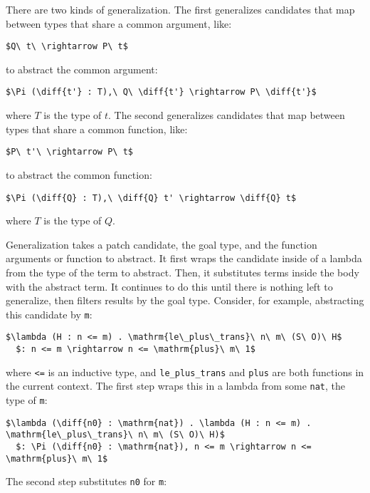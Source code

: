 There are two kinds of generalization.
The first generalizes candidates that map between types that share a common argument, like: %

\begin{lstlisting}[language=coq]
  $Q\ t\ \rightarrow P\ t$
\end{lstlisting}
to abstract the common argument:

\begin{lstlisting}[language=coq]
  $\Pi (\diff{t'} : T),\ Q\ \diff{t'} \rightarrow P\ \diff{t'}$
\end{lstlisting}
where $T$ is the type of $t$.
The second generalizes candidates that map between types that share a common function, like:

\begin{lstlisting}[language=coq]
  $P\ t'\ \rightarrow P\ t$
\end{lstlisting}
to abstract the common function:

\begin{lstlisting}[language=coq]
  $\Pi (\diff{Q} : T),\ \diff{Q} t' \rightarrow \diff{Q} t$
\end{lstlisting}
where $T$ is the type of $Q$.

Generalization takes a patch candidate, the goal type, and the function arguments or function to abstract.
It first wraps the candidate inside of a lambda from the type of the term to abstract.
Then, it substitutes terms inside the body with the abstract term.
It continues to do this until there is nothing left to generalize, then filters results by the goal type.
Consider, for example, abstracting this candidate by \lstinline{m}: %

\begin{lstlisting}[language=coq]
  $\lambda (H : n <= m) . \mathrm{le\_plus\_trans}\ n\ m\ (S\ O)\ H$
  $: n <= m \rightarrow n <= \mathrm{plus}\ m\ 1$
\end{lstlisting}
where \lstinline{<=} is an inductive type, and \lstinline{le_plus_trans} and \lstinline{plus} are both functions in the current context.
The first step wraps this in a lambda from some \lstinline{nat}, the type of \lstinline{m}:

\begin{lstlisting}[language=coq]
  $\lambda (\diff{n0} : \mathrm{nat}) . \lambda (H : n <= m) . \mathrm{le\_plus\_trans}\ n\ m\ (S\ O)\ H)$
  $: \Pi (\diff{n0} : \mathrm{nat}), n <= m \rightarrow n <= \mathrm{plus}\ m\ 1$
\end{lstlisting}
The second step substitutes \lstinline{n0} for \lstinline{m}:

